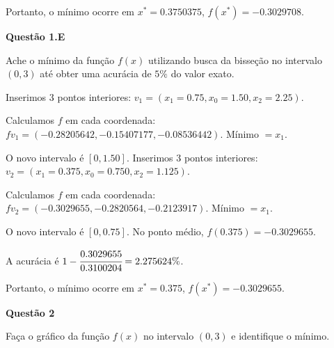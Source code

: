 \documentclass{rbfin}
\begin{document}
Portanto, o mínimo ocorre em $x^* = 0.3750375$, $f(x^*) = -0.3029708$.

\singlespacing

\vspace{6mm}

\large

\textbf{Questão 1.E}

\normalsize

\vspace{6mm}

\doublespacing

Ache o mínimo da função $f(x)$ utilizando busca da bisseção no intervalo $(0, 3)$ até obter uma acurácia de $5\%$ do valor exato.

Inserimos $3$ pontos interiores: $v_1 = (x_1 = 0.75, x_0 = 1.50, x_2 = 2.25)$.

Calculamos $f$ em cada coordenada: $fv_1 = (-0.28205642, -0.15407177, -0.08536442)$. Mínimo $= x_1$.  

O novo intervalo é $[0, 1.50]$. Inserimos $3$ pontos interiores: $v_2 = (x_1 = 0.375, x_0 = 0.750, x_2 = 1.125)$.

Calculamos $f$ em cada coordenada: $fv_2 = (-0.3029655, -0.2820564, -0.2123917)$. Mínimo $= x_1$.

O novo intervalo é $[0, 0.75]$. No ponto médio, $f(0.375) = -0.3029655$.

A acurácia é $1 - \cfrac{0.3029655}{0.3100204} = 2.275624\%$.

Portanto, o mínimo ocorre em $x^* = 0.375$, $f(x^*) = -0.3029655$.

\singlespacing

\vspace{6mm}

\large

\textbf{Questão 2} 

\normalsize

\vspace{6mm}

\doublespacing

Faça o gráfico da função $f(x)$ no intervalo $(0, 3)$ e identifique o mínimo.
\end{document}
